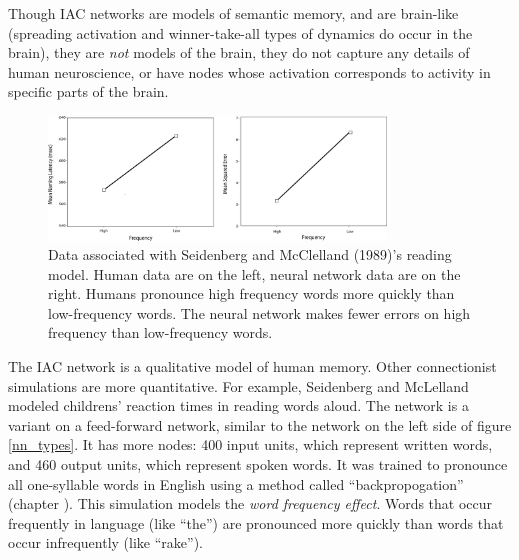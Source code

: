 Though IAC networks are models of semantic memory, and are brain-like (spreading activation and winner-take-all types of dynamics do occur in the brain), they are \emph{not} models of the brain, they do not capture any details of human neuroscience, or have nodes whose activation corresponds to activity in specific parts of the brain.

\begin{figure}[h]
\centering
\includegraphics[width=0.8\textwidth]{./images/seidWordNet_Data3.png}
\caption[From McClelland and Seidenberg, 1989 \cite{seidenberg1989distributed}. Redrawn by Pamela Payne.]{Data associated with Seidenberg and McClelland (1989)'s reading model. Human data are on the left, neural network data are on the right. Humans pronounce high frequency words more quickly than low-frequency words. The neural network makes fewer errors on high frequency than low-frequency words.}
\label{regularityData}
\end{figure}
 
The IAC network is a qualitative model of human memory. Other connectionist simulations are more quantitative. For example, Seidenberg and McLelland  modeled childrens' reaction times in reading words aloud. The network is a variant on a feed-forward network, similar to the network on the left side of figure \ref{nn_types}. It has  more nodes: 400 input units, which represent written words, and 460 output units, which represent spoken words. It was trained to pronounce all one-syllable words in English using a method called ``backpropogation'' (chapter ). This simulation models  the \emph{word frequency effect}. Words that occur frequently in language (like ``the'') are pronounced more quickly than words that occur infrequently (like ``rake'').


